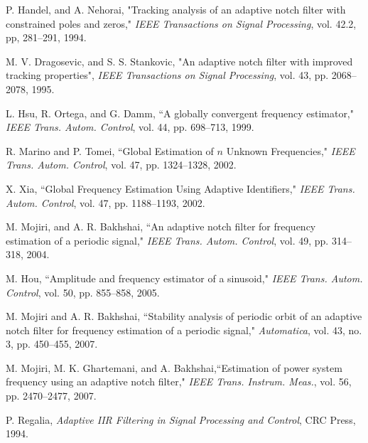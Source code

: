 \documentclass{UCF_ETD}
\begin{document}
\begin{thebibliography}{99}
%


P. Handel,  and A. Nehorai, "Tracking analysis of an adaptive notch filter with constrained poles and zeros,"
\emph{IEEE Transactions on Signal Processing}, vol. 42.2, pp, 281--291,  1994.

M. V. Dragosevic,  and S. S. Stankovic, "An adaptive notch filter with improved tracking properties",
\emph{IEEE Transactions on Signal Processing}, vol.  43, pp. 2068--2078,  1995.



L. Hsu, R. Ortega, and G. Damm, ``A globally convergent frequency estimator," \emph{IEEE Trans. Autom. Control}, vol. 44, pp. 698--713, 1999.

R. Marino and P. Tomei, ``Global Estimation of $n$ Unknown Frequencies," \emph{IEEE Trans. Autom. Control}, vol. 47, pp. 1324--1328,  2002.

X. Xia, ``Global Frequency Estimation Using Adaptive Identifiers," \emph{IEEE Trans. Autom. Control}, vol. 47, pp. 1188--1193,  2002.


M. Mojiri, and A. R. Bakhshai, ``An adaptive notch filter for frequency estimation of a periodic signal," \emph{IEEE Trans. Autom. Control}, vol. 49, pp. 314--318,  2004.

M. Hou, ``Amplitude and frequency estimator of a sinusoid," \emph{IEEE Trans. Autom. Control}, vol. 50, pp. 855--858,  2005.

M. Mojiri and A. R. Bakhshai, ``Stability analysis of periodic orbit of an adaptive notch filter for frequency estimation of a periodic signal," \emph{Automatica}, vol. 43, no. 3, pp. 450--455,  2007.

M. Mojiri, M. K. Ghartemani, and A. Bakhshai,``Estimation of power system frequency using an adaptive notch filter,"  \emph{IEEE Trans. Instrum. Meas.}, vol. 56, pp. 2470--2477,  2007.


P. Regalia, \emph{Adaptive IIR Filtering in Signal Processing and Control},  CRC Press, 1994.


\end{thebibliography}
\end{document}
